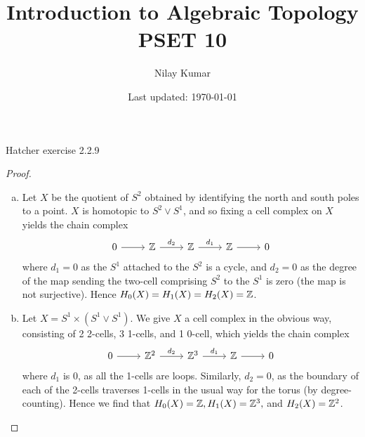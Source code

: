 \documentclass{../../mathnotes}
\title{Introduction to Algebraic Topology PSET 10}
\author{Nilay Kumar}
\date{Last updated: \today}
\begin{document}
\maketitle

\begin{prop}
    Hatcher exercise 2.2.9
\end{prop}
\begin{proof}\hfill
    \begin{enumerate}[(a)]
        \item Let $X$ be the quotient of $S^2$ obtained by identifying the north and south poles
            to a point. $X$ is homotopic to $S^2\vee S^1$, and so fixing a cell complex on $X$ yields
            the chain complex
            \begin{equation*}
                \begin{tikzcd}
                    0\ar{r} & \Z\ar{r}{d_2} & \Z\ar{r}{d_1} & \Z\ar{r} & 0
                \end{tikzcd}
            \end{equation*}
            where $d_1=0$ as the $S^1$ attached to the $S^2$ is a cycle, and $d_2=0$ as the degree
            of the map sending the two-cell comprising $S^2$ to the $S^1$ is zero (the map is not
            surjective). Hence $H_0(X)=H_1(X)=H_2(X)=\mathbb{Z}$.
        \item Let $X=S^1\times (S^1\vee S^1)$. We give $X$ a cell complex in the obvious way, consisting
            of 2 2-cells, 3 1-cells, and 1 0-cell, which yields the chain complex
            \begin{equation*}
                \begin{tikzcd}
                    0\ar{r} & \Z^2\ar{r}{d_2} & \Z^3\ar{r}{d_1} & \Z\ar{r} & 0
                \end{tikzcd}
            \end{equation*}
            where $d_1$ is 0, as all the 1-cells are loops. Similarly, $d_2=0$, as the boundary of
            each of the 2-cells traverses 1-cells in the usual way for the torus (by degree-counting).
            Hence we find that $H_0(X)=\mathbb{Z},H_1(X)=\mathbb{Z}^3,$ and $H_2(X)=\mathbb{Z}^2$.
    \end{enumerate}
\end{proof}
\end{document}
